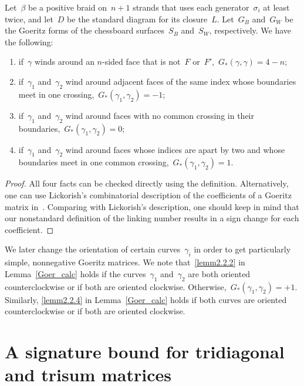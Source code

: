 \documentclass[AHL,Unicode,longabstracts,published]{cedram}
\newcommand*{\romanenumi}{\renewcommand*{\theenumi}{\roman{enumi}}}
\begin{document}
\begin{lemm}\label{Goer_calc}
Let~$\beta$ be a positive braid on~$n+1$ strands that uses each generator~$\sigma_i$ at least twice, and let~$D$ be the standard diagram for its closure~$L$. Let~$G_B$ and~$G_W$ be the Goeritz forms of the chessboard surfaces~$S_B$ and~$S_W$, respectively. We have the following:
\begin{enumerate}\romanenumi
\item\label{lemm2.2.1} if~$\gamma$ winds around an $n$-sided face that is not~$F$ or~$F'$,~$G_\ast(\gamma,\gamma) = 4-n$;
\item\label{lemm2.2.2} if~$\gamma_1$ and~$\gamma_2$ wind around adjacent faces of the same index whose boundaries meet in one crossing,~$G_\ast(\gamma_1, \gamma_2) = -1$;
\item \label{lemm2.2.3} if~$\gamma_1$ and~$\gamma_2$ wind around faces with no common crossing in their boundaries,~$G_\ast(\gamma_1, \gamma_2) = 0$;
\item\label{lemm2.2.4} if~$\gamma_1$ and~$\gamma_2$ wind around faces whose indices are apart by two and whose boundaries meet in one common crossing,~$G_\ast(\gamma_1, \gamma_2) = 1$.
\end{enumerate}
\end{lemm}

\begin{proof}
All four facts can be checked directly using the definition. Alternatively, one can use Lickorish's combinatorial description of the coefficients of a Goeritz matrix in~\cite[Chapter~9]{Lickorish}. Comparing with Lickorish's description, one should keep in mind that our nonstandard definition of the linking number results in a sign change for each coefficient.
\end{proof}

\begin{rema}\label{Goeritz_offdiag_remark}
We later change the orientation of certain curves~$\gamma_i$ in order to get particularly simple, nonnegative Goeritz matrices. We note that~\eqref{lemm2.2.2} in Lemma~\ref{Goer_calc} holds if the curves~$\gamma_1$ and~$\gamma_2$ are both oriented counterclockwise or if both are oriented clockwise. Otherwise,~$G_\ast(\gamma_1, \gamma_2) = +1$. Similarly, \eqref{lemm2.2.4} in Lemma~\ref{Goer_calc} holds if both curves are oriented counterclockwise or if both are oriented clockwise.
\end{rema}



\section{A signature bound for tridiagonal and trisum matrices}\label{s: tridiagonal}
\end{document}
